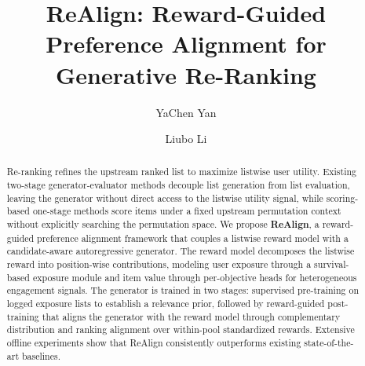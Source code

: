\documentclass[sigconf]{acmart}
\begin{document}
\title{ReAlign: Reward-Guided Preference Alignment for Generative Re-Ranking}

\author{YaChen Yan}

\author{Liubo Li}

\renewcommand{\shortauthors}{YaChen and LiuBo}
\renewcommand{\subtitle}{ReAlign: Reward-Guided Preference Alignment for Generative Re-Ranking}




\begin{abstract}
Re-ranking refines the upstream ranked list to maximize listwise user utility. Existing two-stage generator-evaluator methods decouple list generation from list evaluation, leaving the generator without direct access to the listwise utility signal, while scoring-based one-stage methods score items under a fixed upstream permutation context without explicitly searching the permutation space. We propose \textbf{ReAlign}, a reward-guided preference alignment framework that couples a listwise reward model with a candidate-aware autoregressive generator. The reward model decomposes the listwise reward into position-wise contributions, modeling user exposure through a survival-based exposure module and item value through per-objective heads for heterogeneous engagement signals. The generator is trained in two stages: supervised pre-training on logged exposure lists to establish a relevance prior, followed by reward-guided post-training that aligns the generator with the reward model through complementary distribution and ranking alignment over within-pool standardized rewards. Extensive offline experiments show that ReAlign consistently outperforms existing state-of-the-art baselines.
\end{abstract}
\end{document}
